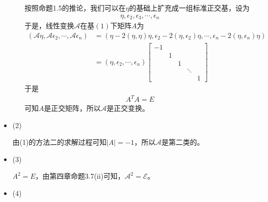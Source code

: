 \documentclass{article}
\begin{document}
\begin{itemize}
\begin{itemize}
                按照命题1.5的推论，我们可以在$\eta$的基础上扩充成一组标准正交基，设为
                \begin{align}
                  \eta, \epsilon_2, \epsilon_3, \cdots, \epsilon_n
                \end{align}
                于是，线性变换$\mathscr{A}$在基$(1)$下矩阵$A$为
                \begin{align*}
                  (\mathscr{A}\eta, \mathscr{A}\epsilon_2, \cdots, \mathscr{A}\epsilon_n)
                   & = (\eta - 2(\eta,\eta)\eta, \epsilon_2 - 2(\eta, \epsilon_2)\eta, \cdots, \epsilon_n - 2(\eta, \epsilon_n)\eta) \\
                   & = (\eta, \epsilon_2, \cdots, \epsilon_n) \begin{bmatrix}
                                                                -1 &                    \\
                                                                   & 1                  \\
                                                                   &   & 1              \\
                                                                   &   &   & \ddots     \\
                                                                   &   &   &        & 1
                                                              \end{bmatrix}
                \end{align*}
                于是
                \begin{align*}
                  A^T A = E
                \end{align*}
                可知$A$是正交矩阵，所以$\mathscr{A}$是正交变换。
        \end{itemize}
  \item (2)

        由(1)的方法二的求解过程可知$|A| = -1$，所以$\mathscr{A}$是第二类的。

  \item (3)

        $A^2 = E$，由第四章命题3.7(ii)可知，$\mathscr{A}^2 = \mathscr{E}$。

  \item (4)


\end{itemize}
\end{document}
